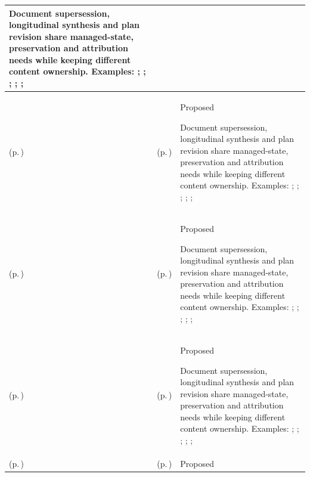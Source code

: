 \begin{longtable}{|>{\raggedright\arraybackslash}p{0.27\TableWidth}|>{\raggedright\arraybackslash}p{0.27\TableWidth}|>{\raggedright\arraybackslash}p{0.46\TableWidth}|}
Document supersession, longitudinal synthesis and plan revision share managed-state, preservation and attribution needs while keeping different content ownership. Examples: \nameref{feature:feat-ise-01}; \nameref{feature:feat-ise-02}; \nameref{feature:feat-ise-03}; \nameref{function:assemble-longitudinal-clinical-record}; \nameref{service:longitudinal-clinical-record-query}; \nameref{function:maintain-active-clinical-record}\\\hline
\nameref{cap:bec-care-plan-administration} (p.\,\pageref{cap:bec-care-plan-administration}) & \nameref{cap:ec-03} (p.\,\pageref{cap:ec-03}) & Proposed

Document supersession, longitudinal synthesis and plan revision share managed-state, preservation and attribution needs while keeping different content ownership. Examples: \nameref{feature:feat-sa-26}; \nameref{function:receive-care-plan}; \nameref{service:care-plan-ingress}; \nameref{function:associate-care-plan-context}; \nameref{service:care-plan-context-query}; \nameref{function:distribute-care-plan-change}\\\hline
\nameref{cap:bec-care-plan-administration} (p.\,\pageref{cap:bec-care-plan-administration}) & \nameref{cap:ec-04} (p.\,\pageref{cap:ec-04}) & Proposed

Document supersession, longitudinal synthesis and plan revision share managed-state, preservation and attribution needs while keeping different content ownership. Examples: \nameref{feature:feat-sa-26}; \nameref{function:receive-care-plan}; \nameref{service:care-plan-ingress}; \nameref{function:associate-care-plan-context}; \nameref{service:care-plan-context-query}; \nameref{function:distribute-care-plan-change}\\\hline
\nameref{cap:bec-care-plan-administration} (p.\,\pageref{cap:bec-care-plan-administration}) & \nameref{cap:ec-07} (p.\,\pageref{cap:ec-07}) & Proposed

Document supersession, longitudinal synthesis and plan revision share managed-state, preservation and attribution needs while keeping different content ownership. Examples: \nameref{feature:feat-sa-26}; \nameref{function:receive-care-plan}; \nameref{service:care-plan-ingress}; \nameref{function:associate-care-plan-context}; \nameref{service:care-plan-context-query}; \nameref{function:distribute-care-plan-change}\\\hline
\nameref{cap:bec-health-information-access} (p.\,\pageref{cap:bec-health-information-access}) & \nameref{cap:ec-05} (p.\,\pageref{cap:ec-05}) & Proposed


\end{longtable}
